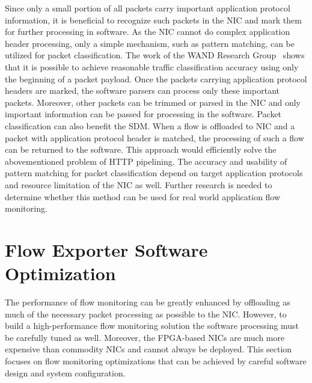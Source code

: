 Since only a small portion of all packets carry important application protocol information, it is beneficial to recognize such packets in the NIC and mark them for further processing in software. As the NIC cannot do complex application header processing, only a simple mechanism, such as pattern matching, can be utilized for packet classification. The work of the WAND Research Group~\cite{Alcock-2012-libprotoident} shows that it is possible to achieve reasonable traffic classification accuracy using only the beginning of a packet payload. Once the packets carrying application protocol headers are marked, the software parsers can process only these important packets. Moreover, other packets can be trimmed or parsed in the NIC and only important information can be passed for processing in the software. Packet classification can also benefit the SDM. When a flow is offloaded to NIC and a packet with application protocol header is matched, the processing of such a flow can be returned to the software. This approach would efficiently solve the abovementioned problem of HTTP pipelining. The accuracy and usability of pattern matching for packet classification depend on target application protocols and resource limitation of the NIC as well. Further research is needed to determine whether this method can be used for real world application flow monitoring.

\section{Flow Exporter Software Optimization}

The performance of flow monitoring can be greatly enhanced by offloading as much of the necessary packet processing as possible to the NIC. However, to build a high-performance flow monitoring solution the software processing must be carefully tuned as well. Moreover, the FPGA-based NICs are much more expensive than commodity NICs and cannot always be deployed. This section focuses on flow monitoring optimizations that can be achieved by careful software design and system configuration.

